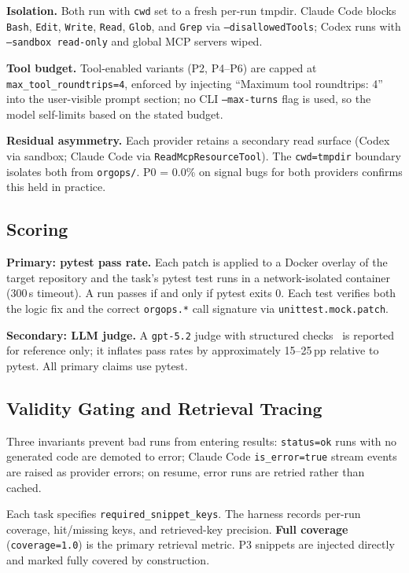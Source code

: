 \documentclass[10pt,conference]{IEEEtran}
\begin{document}
\textbf{Isolation.} Both run with \texttt{cwd} set to a fresh per-run tmpdir.
Claude Code blocks \texttt{Bash}, \texttt{Edit}, \texttt{Write}, \texttt{Read}, \texttt{Glob}, and \texttt{Grep} via \texttt{--disallowedTools}; Codex runs with \texttt{--sandbox read-only} and global MCP servers wiped.

\textbf{Tool budget.} Tool-enabled variants (P2, P4--P6) are capped at
\texttt{max\_tool\_roundtrips=4}, enforced by injecting
``Maximum tool roundtrips: 4'' into the user-visible prompt section;
no CLI \texttt{--max-turns} flag is used, so the model self-limits
based on the stated budget.

\textbf{Residual asymmetry.} Each provider retains a secondary read surface (Codex via sandbox; Claude Code via \texttt{ReadMcpResourceTool}).
The \texttt{cwd=tmpdir} boundary isolates both from \texttt{orgops/}.
P0 = 0.0\% on signal bugs for both providers confirms this held in practice.

\subsection{Scoring}
\label{sec:scoring}

\textbf{Primary: pytest pass rate.}
Each patch is applied to a Docker overlay of the target repository and the task's pytest test runs in a network-isolated container (300\,s timeout).
A run passes if and only if pytest exits 0.
Each test verifies both the logic fix and the correct \texttt{orgops.*} call signature via \texttt{unittest.mock.patch}.

\textbf{Secondary: LLM judge.}
A \texttt{gpt-5.2} judge with structured checks~\cite{li2024llmjudge} is reported for reference only; it inflates pass rates by approximately 15--25\,pp relative to pytest.
All primary claims use pytest.

\subsection{Validity Gating and Retrieval Tracing}
\label{sec:validity}

Three invariants prevent bad runs from entering results:
\texttt{status=ok} runs with no generated code are demoted to error;
Claude Code \texttt{is\_error=true} stream events are raised as provider errors;
on resume, error runs are retried rather than cached.

Each task specifies \texttt{required\_snippet\_keys}.
The harness records per-run coverage, hit/missing keys, and retrieved-key precision.
\textbf{Full coverage} (\texttt{coverage=1.0}) is the primary retrieval metric.
P3 snippets are injected directly and marked fully covered by construction.
\end{document}
